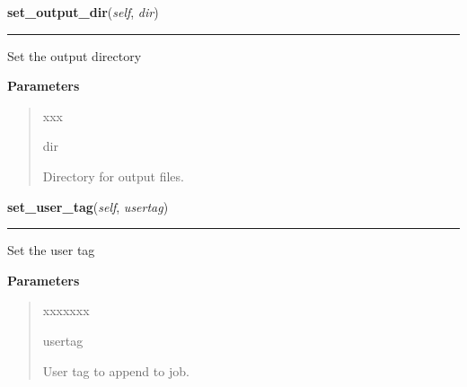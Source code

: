     \label{stochastic:StochasticNode:set_output_dir}
    \vspace{0.5ex}

    \begin{boxedminipage}{\textwidth}

    \raggedright \textbf{set\_output\_dir}(\textit{self}, \textit{dir})

    \vspace{-1.5ex}

    \rule{\textwidth}{0.5\fboxrule}
    Set the output directory

    \vspace{1ex}

      \textbf{Parameters}
      \begin{quote}
        \begin{Ventry}{xxx}

          \item[dir]

          Directory for output files.

        \end{Ventry}

      \end{quote}

    \vspace{1ex}

    \end{boxedminipage}

    \label{stochastic:StochasticNode:set_user_tag}
    \vspace{0.5ex}

    \begin{boxedminipage}{\textwidth}

    \raggedright \textbf{set\_user\_tag}(\textit{self}, \textit{usertag})

    \vspace{-1.5ex}

    \rule{\textwidth}{0.5\fboxrule}
    Set the user tag

    \vspace{1ex}

      \textbf{Parameters}
      \begin{quote}
        \begin{Ventry}{xxxxxxx}

          \item[usertag]

          User tag to append to job.

        \end{Ventry}

      \end{quote}

    \vspace{1ex}

    \end{boxedminipage}

